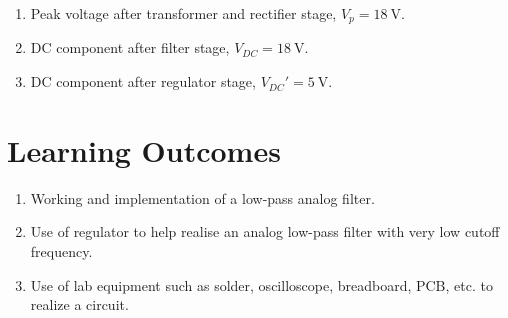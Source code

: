 \documentclass[journal,12pt,twocolumn]{IEEEtran}
\begin{document}

\begin{enumerate}
    \item Peak voltage after transformer and rectifier stage, 
        $V_p = \SI[parse-numbers=false]{18}{\V}$.
    \item DC component after filter stage, 
        $V_{DC} = \SI[parse-numbers=false]{18}{\V}$.
    \item DC component after regulator stage, $V_{DC}' = \SI{5}{\V}$.
\end{enumerate}

\section{Learning Outcomes}
\begin{enumerate}
    \item Working and implementation of a low-pass analog filter.
    \item Use of regulator to help realise an analog low-pass filter with
        very low cutoff frequency.
    \item Use of lab equipment such as solder, oscilloscope, breadboard, PCB, etc.
        to realize a circuit.
\end{enumerate}
\end{document}
